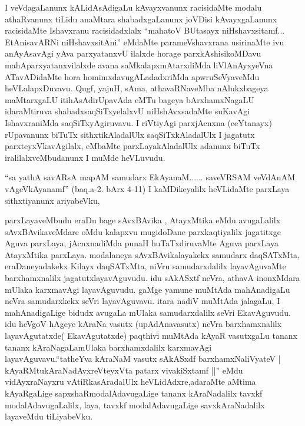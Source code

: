 \begin{artha}
I veVdagaLanunx kALidAsAdigaLu kAvayxvanunx racisidaMte modalu
athaRvanunx tiLidu anaMtara shabadxgaLanunx joVDisi kAvayxgaLanunx
racisidaMte Ishavxranu racisidadxlalx ``mahatoV BUtasayx niHshavxsitamf... EtAnisavARNi niHshavxsitAni'' eMdaMte
 parameVshavxrana usirinaMte ivu anAyAsavAgi yAva parxyatanxvU ilalxde
horage parxkAshisikoMDavu mahAparxyatanxvilalxde avana
saMkalapxmAtarxdiMda liVlAnAyxyeVna ATavADidaMte hora
homimxdavugALadadxriMda apwruSeVyaveMdu heVLalapxDuvavu. Qugf, yajuH,
sAma, athavaRNaveMba nAlukxbageya maMtarxgaLU itihAsAdirUpavAda eMTu
bageya bArxhamxNagaLU idaraMtiruva shabadxsaqSiTxyelalxvU
niHshAvxsadaMte suKavAgi IshavxraniMda saqSiTxyAgiruvavu. I riVtiyAgi
parxjAcnxna (ceYtanayx) rUpavanunx biTuTx sithxtikAladalUlx
saqSiTxkAladalUlx I jagatutx parxteyxVkavAgilalx, eMbaMte
parxLayakAladalUlx adanunx biTuTx iralilalxveMbudanunx I muMde
heVLuvudu. 
\end{artha}

\begin{artha}
``sa yathA savARsA mapAM samudarx EkAyanaM...... saveVRSAM veVdAnAM vAgeVkAyanamf'' (baq.a-2. bArx 4-11) I kaMDikeyalilx heVLidaMte parxLaya
 sithxtiyanunx ariyabeVku,
\end{artha}

\centerline{ }

\begin{artha}
parxLayaveMbudu eraDu bage sAvxBAvika , AtayxMtika eMdu avugaLalilx
 sAvxBAvikaveMdare oMdu kalapxvu mugidoDane parxkaqtiyalilx jagatitxge
Aguva parxLaya, jAcnxnadiMda punaH huTaTxdiruvaMte Aguva parxLaya
AtayxMtika parxLaya. modalaneya sAvxBAvikalayakekx samudarx
daqSATxMta, eraDaneyadakekx Kilayx daqSATxMta, niVru  samudarxdalilx
layavAguvaMte barxhamxnalilx jagatutxlayavAguvudu. idu sAkASxtf neVra, athavA
inonxMdara mUlaka karxmavAgi layavAguvudu. gaMge yamune muMtAda
mahAnadigaLu neVra samudarxkekx seVri layavAguvavu. itara nadiV
muMtAda jalagaLu, I mahAnadigaLige bidudx avugaLa mUlaka
samudarxdalilx seVri EkavAguvudu. idu heVgoV hAgeye kAraNa vasutx
(upAdAnavasutx) neVra barxhamxnalilx layavAgutatxde( EkavAgutatxde)
paqthivi muMtAda kAyaR vasutxgaLu tananx tananx kAraNagaLamUlaka
barxhamxdalilx karxmavAgi layavAguvavu.``tatheYva kAraNaM vasutx sAkASxdf barxhamxNaliVyateV | kAyaRMtukAraNadAvxreVteyxVta patarx vivakiSxtamf ||'' eMdu vidAyxraNayxru
vAtiRkasAradalUlx heVLidAdxre,adaraMte aMtima kAyaRgaLige
sapxshaRmodalAdavugaLige tananx kAraNadalilx tavxkf
modalAdavugaLalilx, laya, tavxkf modalAdavugaLige savxkAraNadalilx
layaveMdu tiLiyabeVku.
\end{artha}

